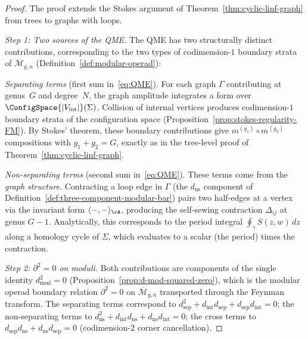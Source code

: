 \begin{proof}
The proof extends the Stokes argument of
Theorem~\ref{thm:cyclic-linf-graph} from trees to graphs with loops.

\emph{Step 1: Two sources of the QME.}
The QME has two structurally distinct contributions,
corresponding to the two types of codimension-$1$ boundary
strata of $\overline{\mathcal{M}}_{g,n}$
(Definition~\ref{def:modular-operad}):

\emph{Separating terms} (first sum in~\eqref{eq:QME}).
For each graph $\Gamma$ contributing at genus~$G$ and degree~$N$,
the graph amplitude integrates a form over
$\ConfigSpace{|V_{\mathrm{int}}|}(\Sigma)$.
Collision of internal vertices produces codimension-$1$ boundary
strata of the configuration space
(Proposition~\ref{prop:stokes-regularity-FM}).
By Stokes' theorem, these boundary contributions give
$m^{(g_1)} \circ m^{(g_2)}$ compositions with $g_1 + g_2 = G$,
exactly as in the tree-level proof of
Theorem~\ref{thm:cyclic-linf-graph}.

\emph{Non-separating terms} (second sum in~\eqref{eq:QME}).
These terms come from the \emph{graph structure}. Contracting a loop edge in
$\Gamma$ (the $d_{\mathrm{ns}}$ component of
Definition~\ref{def:three-component-modular-bar})
pairs two half-edges at a vertex via the invariant form
$\langle -, - \rangle_\cA$, producing the self-sewing contraction
$\Delta_{ij}$ at genus $G - 1$.
Analytically, this corresponds to the period integral
$\oint_\gamma S(z, w)\, dz$ along a homology cycle of $\Sigma$,
which evaluates to a scalar (the period) times the contraction.

\emph{Step 2: $\partial^2 = 0$ on moduli.}
Both contributions are components of the single identity
$d_{\mathrm{mod}}^2 = 0$
(Proposition~\ref{prop:d-mod-squared-zero}),
which is the modular operad boundary relation
$\partial^2 = 0$ on $\overline{\mathcal{M}}_{g,n}$
transported through the Feynman transform.
The separating terms correspond to
$d_{\mathrm{sep}}^2 + d_{\mathrm{int}} d_{\mathrm{sep}}
+ d_{\mathrm{sep}} d_{\mathrm{int}} = 0$;
the non-separating terms to
$d_{\mathrm{ns}}^2 + d_{\mathrm{int}} d_{\mathrm{ns}}
+ d_{\mathrm{ns}} d_{\mathrm{int}} = 0$;
the cross terms to
$d_{\mathrm{sep}} d_{\mathrm{ns}}
+ d_{\mathrm{ns}} d_{\mathrm{sep}} = 0$
(codimension-$2$ corner cancellation).
\end{proof}

